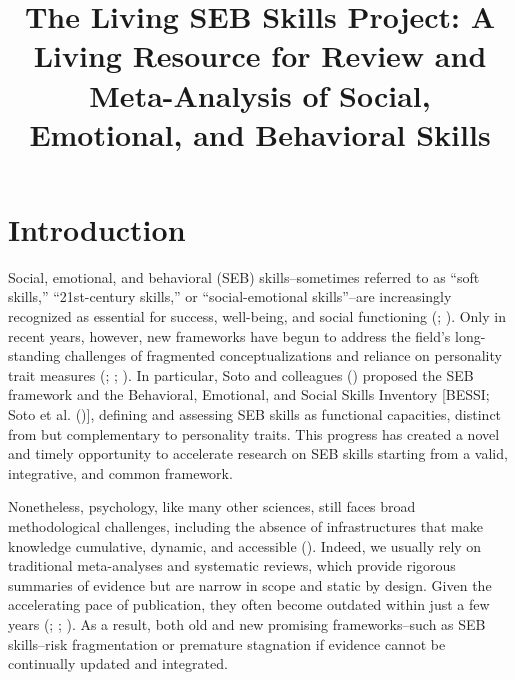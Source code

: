 \documentclass[
  man,
  longtable,
  nolmodern,
  notxfonts,
  notimes,
  colorlinks=true,linkcolor=blue,citecolor=blue,urlcolor=blue]{apa7}
\title{The Living SEB Skills Project: A Living Resource for Review and
Meta-Analysis of Social, Emotional, and Behavioral Skills}
\affiliation{
{Department of General Psychology, University of Padova}}
\begin{document}
\maketitle


\setcounter{secnumdepth}{-\maxdimen} %

\setlength\LTleft{0pt}


\section{Introduction}\label{introduction}

Social, emotional, and behavioral (SEB) skills--sometimes referred to as
``soft skills,'' ``21st-century skills,'' or ``social-emotional
skills''--are increasingly recognized as essential for success,
well-being, and social functioning
(;
). Only in recent
years, however, new frameworks have begun to address the field's
long-standing challenges of fragmented conceptualizations and reliance
on personality trait measures
(; ; ). In particular, Soto and colleagues
() proposed the SEB
framework and the Behavioral, Emotional, and Social Skills Inventory
{[}BESSI; Soto et al.
(){]},
defining and assessing SEB skills as functional capacities, distinct
from but complementary to personality traits. This progress has created
a novel and timely opportunity to accelerate research on SEB skills
starting from a valid, integrative, and common framework.

Nonetheless, psychology, like many other sciences, still faces broad
methodological challenges, including the absence of infrastructures that
make knowledge cumulative, dynamic, and accessible
(). Indeed, we usually rely on traditional
meta-analyses and systematic reviews, which provide rigorous summaries
of evidence but are narrow in scope and static by design. Given the
accelerating pace of publication, they often become outdated within just
a few years (; ; ). As a result, both old and new promising frameworks--such
as SEB skills--risk fragmentation or premature stagnation if evidence
cannot be continually updated and integrated.
\end{document}
